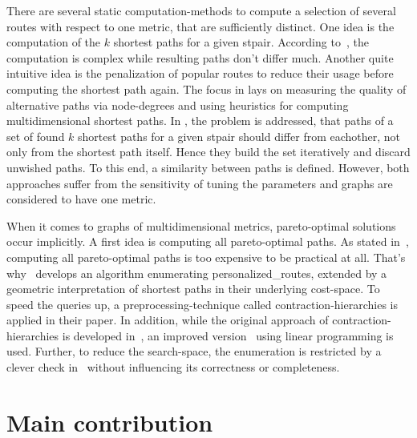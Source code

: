         There are several static computation-methods to compute a selection of several routes with respect to one \gls{metric}, that are sufficiently distinct.
        One idea is the computation of the $k$ shortest paths for a given \gls{stpair}.
        According to~\cite{eppstein:finding_k_shortest_paths}, the computation is complex while resulting paths don't differ much.
        Another quite intuitive idea is the penalization of popular routes to reduce their usage before computing the shortest path again.
        The focus in \cite{bader:alternative-route-graphs} lays on measuring the quality of alternative paths via node-degrees and using heuristics for computing multidimensional shortest paths.
        In \cite{chondrogiannis:k_shortest_paths}, the problem is addressed, that paths of a set of found $k$ shortest paths for a given \gls{stpair} should differ from eachother, not only from the shortest path itself.
        Hence they build the set iteratively and discard unwished paths.
        To this end, a similarity between paths is defined.
        However, both approaches suffer from the sensitivity of tuning the parameters and graphs are considered to have one \gls{metric}.

        When it comes to graphs of multidimensional \glspl{metric}, pareto-optimal solutions occur implicitly.
        A first idea is computing all pareto-optimal paths.
        As stated in~\cite{delling:pareto-paths}, computing all pareto-optimal paths is too expensive to be practical at all.
        That's why~\cite{barth:alternative_multicriteria_routes} develops an algorithm enumerating \glspl{personalized_route}, extended by a geometric interpretation of shortest paths in their underlying \gls{cost}-space.
        To speed the queries up, a preprocessing-technique called \gls{contraction-hierarchies} is applied in their paper.
        In addition, while the original approach of contraction-hierarchies is developed in~\cite{geisberger:contraction_hierarchies}, an improved version~\cite{funke:personal-routes} using linear programming is used.
        Further, to reduce the search-space, the enumeration is restricted by a clever check in~\cite{barth:alternative_routes} without influencing its correctness or completeness.

\section{Main contribution}

